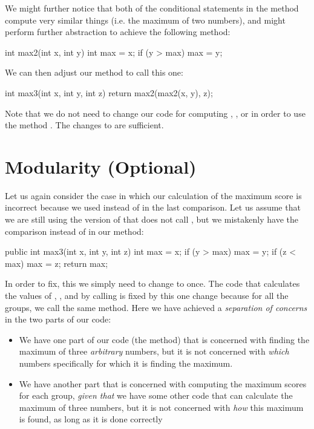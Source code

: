 We might further notice that both of the conditional statements
in the  method
compute very similar things (i.e. the maximum of two numbers),
and might perform further abstraction to achieve the following
method:
\begin{code}
int max2(int x, int y) {
  int max = x;
  if (y > max) {
    max = y; 
  }
}
\end{code}

We can then adjust our  method to call this one:
\begin{code}
int max3(int x, int y, int z) {
  return max2(max2(x, y), z);
}
\end{code}

Note that we do not need to change our code
for computing , ,
or  in order to use the method
. The changes to  are sufficient.

\section{Modularity (Optional)}\label{sec:modularity}
Let us again consider the case in which our calculation of the maximum
score is incorrect because we used \ic{<} instead of \ic{>} in
the last comparison. Let us assume that we are still using the
version of  that does not call , but
we mistakenly have the comparison  instead of
 in our method:
\begin{code}
public int max3(int x, int y, int z) {
  int max = x;
  if (y > max) {
    max = y;
  }
  if (z < max) {
    max = z;
  }
  return max;
}
\end{code}

In order to fix, this we simply need to change 
to  once. The code that calculates
the values of , ,
and  by calling  is fixed by this
one change because for all the groups, we call the
same method. Here we have achieved a \emph{separation of concerns}
in the two parts of our code:
\begin{itemize}
\item We have one part of our code (the  method)
that is concerned with finding the maximum of three \emph{arbitrary}
numbers, but it is not concerned with \emph{which} numbers
specifically for which it is finding the maximum.
\item We have another part that
is concerned with computing the maximum scores for each group,
\emph{given that} we have some other code that
can calculate the maximum of three numbers, but it is
not concerned with \emph{how} this maximum is found,
as long as it is done correctly
\end{itemize}

